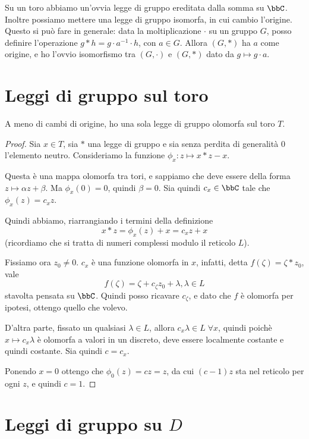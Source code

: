 Su un toro abbiamo un'ovvia legge di gruppo ereditata dalla somma su $\bbC$. Inoltre possiamo mettere una legge di gruppo isomorfa, in cui cambio l'origine. Questo si può fare in generale: data la moltiplicazione $\cdot$ su un gruppo $G$, posso definire l'operazione $g * h = g\cdot a^{-1}\cdot h$, con $a\in G$. Allora $(G,*)$ ha $a$ come origine, e ho l'ovvio isomorfismo tra $(G,\cdot)$ e $(G,*)$ dato da $g\mapsto g\cdot a$.

\section{Leggi di gruppo sul toro}

\begin{proposizione}
A meno di cambi di origine, ho una sola legge di gruppo olomorfa sul toro $T$.
\end{proposizione}

\begin{proof}
Sia $x \in T$, sia $*$ una legge di gruppo e sia senza perdita di generalità $0$ l'elemento neutro. Consideriamo la funzione $\phi_x: z \mapsto x * z - x$.

Questa è una mappa olomorfa tra tori, e sappiamo che deve essere della forma $z \mapsto \alpha z + \beta$. Ma $\phi_x(0)=0$, quindi $\beta=0$. Sia quindi $c_x \in \bbC$ tale che $\phi_x(z)=c_xz$.

Quindi abbiamo, riarrangiando i termini della definizione
\[
 x*z = \phi_x(z) + x = c_xz + x
\]
(ricordiamo che si tratta di numeri complessi modulo il reticolo $L$).

Fissiamo ora $z_0\ne 0$. $c_x$ è una funzione olomorfa in $x$, infatti, detta $f(\zeta) = \zeta * z_0$, vale
\[
    f(\zeta) = \zeta + c_\zeta z_0 + \lambda, \lambda \in L
\]
stavolta pensata su $\bbC$. Quindi posso ricavare $c_\zeta$, e dato che $f$ è olomorfa per ipotesi, ottengo quello che volevo.

D'altra parte, fissato un qualsiasi $\lambda \in L$, allora $c_x\lambda \in L \; \forall x$, quindi poichè $x \mapsto c_x \lambda$ è olomorfa a valori in un discreto, deve essere localmente costante e quindi costante. Sia quindi $c=c_x$.

Ponendo $x=0$ ottengo che $\phi_0(z) = cz = z$, da cui $(c-1)z$ sta nel reticolo per ogni $z$, e quindi $c=1$.

\end{proof}

\section{Leggi di gruppo su $D$}

